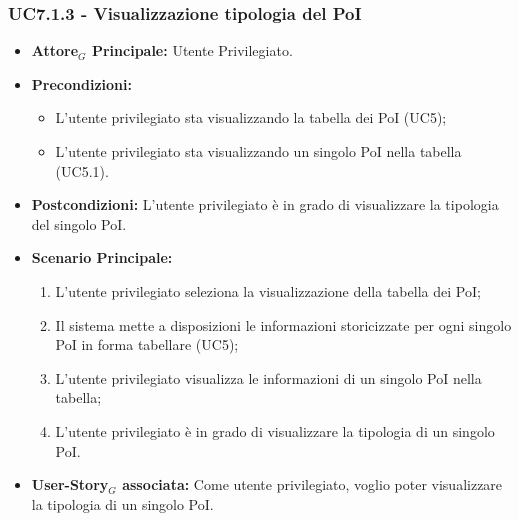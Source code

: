 \documentclass[11pt]{article}
\begin{document}
\begin{justify}
\subsubsection{\textbf{UC7.1.3 - Visualizzazione tipologia del PoI}}
\label{UC7.1.3}
\begin{itemize}
    \item \textbf{Attore$_G$ Principale:} Utente Privilegiato.
    \item \textbf{Precondizioni:} 
        \begin{itemize}
          \item L'utente privilegiato sta visualizzando la tabella dei PoI (UC5);
            \item L'utente privilegiato sta visualizzando un singolo PoI nella tabella (UC5.1).
        \end{itemize}
      \item \textbf{Postcondizioni:} L'utente privilegiato è in grado di visualizzare la tipologia del singolo PoI.\\
    \item \textbf{Scenario Principale:} 
        \begin{enumerate}
        \item L'utente privilegiato seleziona la visualizzazione della tabella dei PoI;
          \item Il sistema mette a disposizioni le informazioni storicizzate per ogni singolo PoI in forma tabellare (UC5);
          \item L'utente privilegiato visualizza le informazioni di un singolo PoI nella tabella;
            \item L'utente privilegiato è in grado di visualizzare la tipologia di un singolo PoI.
        \end{enumerate}
    \item \textbf{User-Story$_G$ associata:} Come utente privilegiato, voglio poter visualizzare la tipologia di un singolo PoI.
\end{itemize}

\end{justify}
\end{document}

